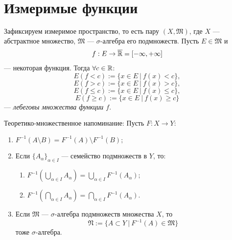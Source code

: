 \section{Измеримые функции}
\begin{definition}
    Зафиксируем измеримое пространство, то есть пару $(X, \mathfrak{M})$, где $X$ — абстрактное множество, $\mathfrak{M}$ — $\sigma$-алгебра его подмножеств.
    Пусть $E \in \mathfrak{M}$ и
    \[f: E \to \overline{\mathbb{R}} = [-\infty, +\infty]\]
    — некоторая функция.
    Тогда
    $\forall c \in \mathbb{R}$:
    \[E(f<c) := \{x \in E \ | \ f(x) < c\},\]
    \[E(f>c) := \{x \in E \ | \ f(x) > c\},\]
    \[E(f \leqslant c) := \{x \in E \ | \ f(x) \leqslant c\},\]
    \[E(f \geqslant c) := \{x \in E \ | \ f(x) \geqslant c\}\]
    — \textit{лебеговы множества функции $f$}.
\end{definition} 

Теоретико-множественное напоминание:
Пусть $F: X \to Y$:
\begin{enumerate}
    \item $F^{-1}(A \setminus B) = F^{-1}(A) \setminus F^{-1}(B);$
    \item Если $\{A_\alpha\}_{\alpha \in I}$ — семейство подмножеств в $Y$, то:
    \begin{enumerate}
        \item $F^{-1} \left(\bigcup\limits_{\alpha \in I} A_\alpha\right) = \bigcup\limits_{\alpha \in I} F^{-1}(A_\alpha);$
        \item $F^{-1} \left(\bigcap\limits_{\alpha \in I} A_\alpha\right) = \bigcap\limits_{\alpha \in I} F^{-1}(A_\alpha)$.
    \end{enumerate}
    \item Если $\mathfrak{M}$ — $\sigma$-алгебра подмножеств множества $X$, то 
    $$\mathfrak{N} := \{A \subset Y \ | \ F^{-1}(A) \in \mathfrak{M}\}$$
    тоже $\sigma$-алгебра.
\end{enumerate}

